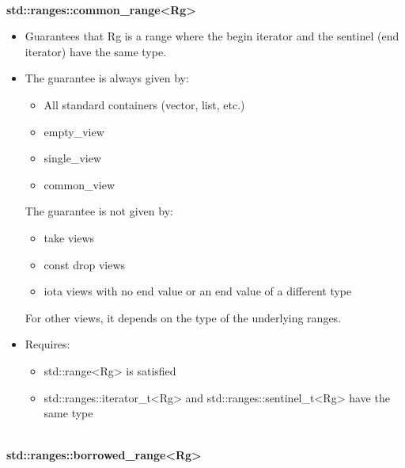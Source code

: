 \noindent
\hspace*{\fill} \\ %
\textbf{std::ranges::common\_range<Rg>}

\begin{itemize}
\item
Guarantees that Rg is a range where the begin iterator and the sentinel (end iterator) have the same type.

\item
The guarantee is always given by:

\begin{itemize}
\item
All standard containers (vector, list, etc.)

\item
empty\_view

\item
single\_view

\item
common\_view
\end{itemize}

The guarantee is not given by:

\begin{itemize}
\item
take views

\item
const drop views

\item
iota views with no end value or an end value of a different type
\end{itemize}

For other views, it depends on the type of the underlying ranges.

\item
Requires:

\begin{itemize}
\item
std::range<Rg> is satisfied

\item
std::ranges::iterator\_t<Rg> and std::ranges::sentinel\_t<Rg> have the same type
\end{itemize}
\end{itemize}

\noindent
\hspace*{\fill} \\ %
\textbf{std::ranges::borrowed\_range<Rg>}

